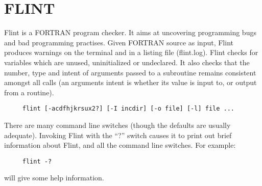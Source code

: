 \documentclass{report}
\begin{document}
\section{FLINT}
Flint is a FORTRAN program checker. It aims at uncovering programming
bugs and bad programming practises. Given FORTRAN source as input, Flint
produces warnings on the terminal and in a listing file (flint.log).
Flint checks for variables which are unused, uninitialized or
undeclared. It also checks that the number, type and intent of arguments
passed to a subroutine remains consistent amongst all calls (an arguments
intent is whether its  value is input to, or output from a routine).
\begin{verbatim}
     flint [-acdfhjkrsux2?] [-I incdir] [-o file] [-l] file ...
\end{verbatim}
There are many command line switches (though the defaults are usually adequate).
Invoking Flint with the ``?'' switch causes it to print out brief information
about Flint, and all the command line switches. For example:
\begin{verbatim}
     flint -?
\end{verbatim}
will give some help information.
\end{document}
